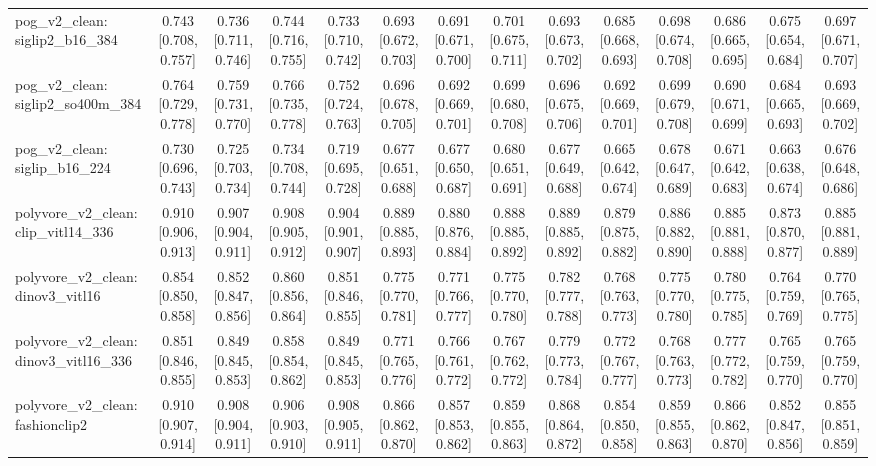 \begin{table}[t]
\begin{tabular}{lccccccccccccc}
pog\_v2\_clean: siglip2\_b16\_384 & 0.743 [0.708, 0.757] & 0.736 [0.711, 0.746] & 0.744 [0.716, 0.755] & 0.733 [0.710, 0.742] & 0.693 [0.672, 0.703] & 0.691 [0.671, 0.700] & 0.701 [0.675, 0.711] & 0.693 [0.673, 0.702] & 0.685 [0.668, 0.693] & 0.698 [0.674, 0.708] & 0.686 [0.665, 0.695] & 0.675 [0.654, 0.684] & 0.697 [0.671, 0.707] \\
pog\_v2\_clean: siglip2\_so400m\_384 & 0.764 [0.729, 0.778] & 0.759 [0.731, 0.770] & 0.766 [0.735, 0.778] & 0.752 [0.724, 0.763] & 0.696 [0.678, 0.705] & 0.692 [0.669, 0.701] & 0.699 [0.680, 0.708] & 0.696 [0.675, 0.706] & 0.692 [0.669, 0.701] & 0.699 [0.679, 0.708] & 0.690 [0.671, 0.699] & 0.684 [0.665, 0.693] & 0.693 [0.669, 0.702] \\
pog\_v2\_clean: siglip\_b16\_224 & 0.730 [0.696, 0.743] & 0.725 [0.703, 0.734] & 0.734 [0.708, 0.744] & 0.719 [0.695, 0.728] & 0.677 [0.651, 0.688] & 0.677 [0.650, 0.687] & 0.680 [0.651, 0.691] & 0.677 [0.649, 0.688] & 0.665 [0.642, 0.674] & 0.678 [0.647, 0.689] & 0.671 [0.642, 0.683] & 0.663 [0.638, 0.674] & 0.676 [0.648, 0.686] \\
polyvore\_v2\_clean: clip\_vitl14\_336 & 0.910 [0.906, 0.913] & 0.907 [0.904, 0.911] & 0.908 [0.905, 0.912] & 0.904 [0.901, 0.907] & 0.889 [0.885, 0.893] & 0.880 [0.876, 0.884] & 0.888 [0.885, 0.892] & 0.889 [0.885, 0.892] & 0.879 [0.875, 0.882] & 0.886 [0.882, 0.890] & 0.885 [0.881, 0.888] & 0.873 [0.870, 0.877] & 0.885 [0.881, 0.889] \\
polyvore\_v2\_clean: dinov3\_vitl16 & 0.854 [0.850, 0.858] & 0.852 [0.847, 0.856] & 0.860 [0.856, 0.864] & 0.851 [0.846, 0.855] & 0.775 [0.770, 0.781] & 0.771 [0.766, 0.777] & 0.775 [0.770, 0.780] & 0.782 [0.777, 0.788] & 0.768 [0.763, 0.773] & 0.775 [0.770, 0.780] & 0.780 [0.775, 0.785] & 0.764 [0.759, 0.769] & 0.770 [0.765, 0.775] \\
polyvore\_v2\_clean: dinov3\_vitl16\_336 & 0.851 [0.846, 0.855] & 0.849 [0.845, 0.853] & 0.858 [0.854, 0.862] & 0.849 [0.845, 0.853] & 0.771 [0.765, 0.776] & 0.766 [0.761, 0.772] & 0.767 [0.762, 0.772] & 0.779 [0.773, 0.784] & 0.772 [0.767, 0.777] & 0.768 [0.763, 0.773] & 0.777 [0.772, 0.782] & 0.765 [0.759, 0.770] & 0.765 [0.759, 0.770] \\
polyvore\_v2\_clean: fashionclip2 & 0.910 [0.907, 0.914] & 0.908 [0.904, 0.911] & 0.906 [0.903, 0.910] & 0.908 [0.905, 0.911] & 0.866 [0.862, 0.870] & 0.857 [0.853, 0.862] & 0.859 [0.855, 0.863] & 0.868 [0.864, 0.872] & 0.854 [0.850, 0.858] & 0.859 [0.855, 0.863] & 0.866 [0.862, 0.870] & 0.852 [0.847, 0.856] & 0.855 [0.851, 0.859] \\

\end{tabular}
\end{table}
